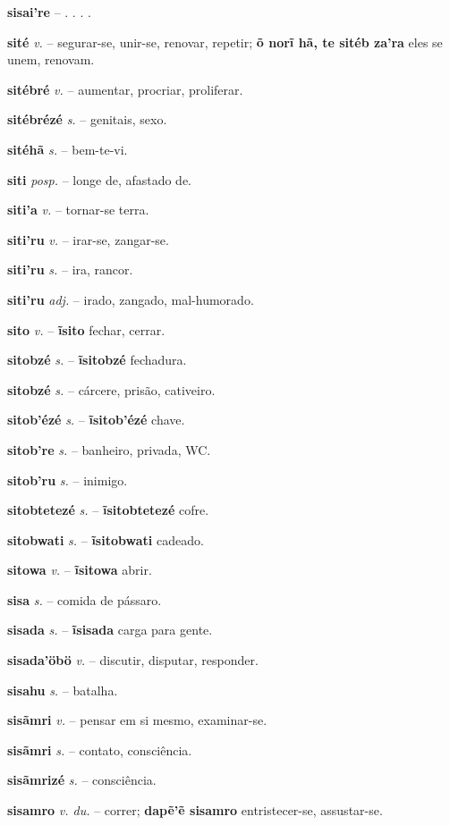 \textbf{sisai're} \textit{} -- . . . .

\textbf{sité} \textit{v.} -- segurar-se, unir-se, renovar, repetir; \textbf{õ norĩ hã, te sitéb za'ra} eles se unem, renovam.

\textbf{sitébré} \textit{v.} -- aumentar, procriar, proliferar.

\textbf{sitébrézé} \textit{s.} -- genitais, sexo.

\textbf{sitéhã} \textit{s.} -- bem-te-vi.

\textbf{siti} \textit{posp.} -- longe de, afastado de.

\textbf{siti'a} \textit{v.} -- tornar-se terra.

\textbf{siti'ru} \textit{v.} -- irar-se, zangar-se.

\textbf{siti'ru} \textit{s.} -- ira, rancor.

\textbf{siti'ru} \textit{adj.} -- irado, zangado, mal-humorado.

\textbf{sito} \textit{v.} -- \textbf{ĩsito} fechar, cerrar.

\textbf{sitobzé} \textit{s.} -- \textbf{ĩsitobzé} fechadura.

\textbf{sitobzé} \textit{s.} -- cárcere, prisão, cativeiro.

\textbf{sitob'ézé} \textit{s.} -- \textbf{ĩsitob'ézé} chave.

\textbf{sitob're} \textit{s.} -- banheiro, privada, WC.

\textbf{sitob'ru} \textit{s.} -- inimigo.

\textbf{sitobtetezé} \textit{s.} -- \textbf{ĩsitobtetezé} cofre.

\textbf{sitobwati} \textit{s.} -- \textbf{ĩsitobwati} cadeado.

\textbf{sitowa} \textit{v.} -- \textbf{ĩsitowa} abrir.

\textbf{sisa} \textit{s.} -- comida de pássaro.

\textbf{sisada} \textit{s.} -- \textbf{ĩsisada} carga para gente.

\textbf{sisada'öbö} \textit{v.} -- discutir, disputar, responder.

\textbf{sisahu} \textit{s.} -- batalha.

\textbf{sisãmri} \textit{v.} -- pensar em si mesmo, examinar-se.

\textbf{sisãmri} \textit{s.} -- contato, consciência.

\textbf{sisãmrizé} \textit{s.} -- consciência.

\textbf{sisamro} \textit{v. du.} -- correr; \textbf{dapẽ'ẽ sisamro} entristecer-se, assustar-se.

